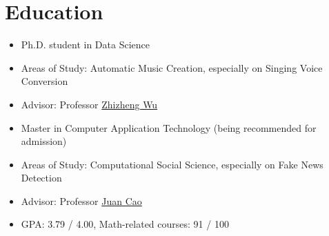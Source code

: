 \documentclass{resume}
\begin{document}





\section{Education}
{
  \small 
\begin{itemize}
  \item Ph.D. student in Data Science
  \item Areas of Study: Automatic Music Creation, especially on Singing Voice Conversion
  \item Advisor: Professor \href{https://scholar.google.com/citations?user=K6zhweAAAAAJ&hl=en}{Zhizheng Wu} 
\end{itemize}
}

{
  \small 
\begin{itemize}
  \item Master in Computer Application Technology (being recommended for admission)
  \item Areas of Study: Computational Social Science, especially on Fake News Detection
  \item Advisor: Professor \href{https://scholar.google.com/citations?user=fSBdNg0AAAAJ&hl=zh-CN}{Juan Cao}
  \item GPA: 3.79 / 4.00, Math-related courses: 91 / 100
\end{itemize}
}
\end{document}
